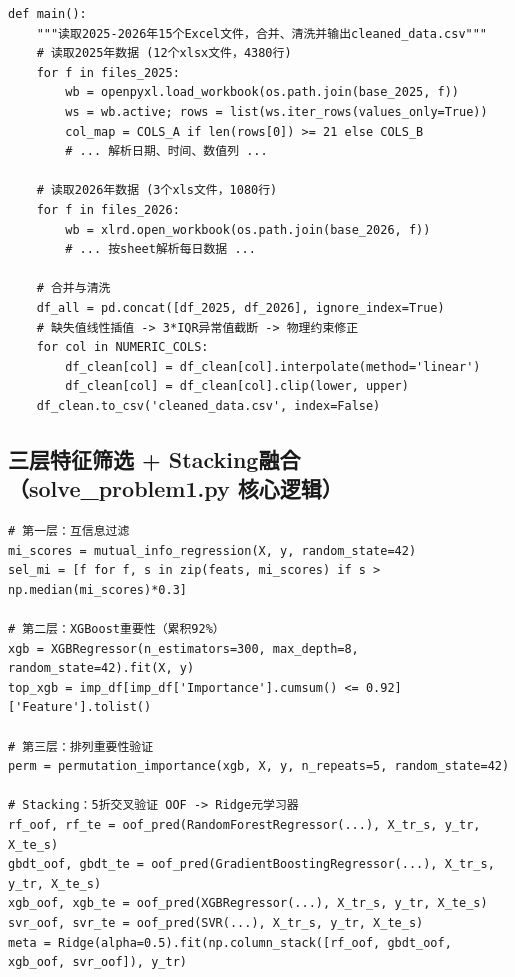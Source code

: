 \documentclass[12pt,a4paper]{ctexart}
\begin{document}
\begin{lstlisting}
def main():
    """读取2025-2026年15个Excel文件，合并、清洗并输出cleaned_data.csv"""
    # 读取2025年数据 (12个xlsx文件，4380行)
    for f in files_2025:
        wb = openpyxl.load_workbook(os.path.join(base_2025, f))
        ws = wb.active; rows = list(ws.iter_rows(values_only=True))
        col_map = COLS_A if len(rows[0]) >= 21 else COLS_B
        # ... 解析日期、时间、数值列 ...

    # 读取2026年数据 (3个xls文件，1080行)
    for f in files_2026:
        wb = xlrd.open_workbook(os.path.join(base_2026, f))
        # ... 按sheet解析每日数据 ...

    # 合并与清洗
    df_all = pd.concat([df_2025, df_2026], ignore_index=True)
    # 缺失值线性插值 -> 3*IQR异常值截断 -> 物理约束修正
    for col in NUMERIC_COLS:
        df_clean[col] = df_clean[col].interpolate(method='linear')
        df_clean[col] = df_clean[col].clip(lower, upper)
    df_clean.to_csv('cleaned_data.csv', index=False)
\end{lstlisting}

\subsection*{三层特征筛选 + Stacking融合（solve\_problem1.py 核心逻辑）}

\begin{lstlisting}
# 第一层：互信息过滤
mi_scores = mutual_info_regression(X, y, random_state=42)
sel_mi = [f for f, s in zip(feats, mi_scores) if s > np.median(mi_scores)*0.3]

# 第二层：XGBoost重要性（累积92%）
xgb = XGBRegressor(n_estimators=300, max_depth=8, random_state=42).fit(X, y)
top_xgb = imp_df[imp_df['Importance'].cumsum() <= 0.92]['Feature'].tolist()

# 第三层：排列重要性验证
perm = permutation_importance(xgb, X, y, n_repeats=5, random_state=42)

# Stacking：5折交叉验证 OOF -> Ridge元学习器
rf_oof, rf_te = oof_pred(RandomForestRegressor(...), X_tr_s, y_tr, X_te_s)
gbdt_oof, gbdt_te = oof_pred(GradientBoostingRegressor(...), X_tr_s, y_tr, X_te_s)
xgb_oof, xgb_te = oof_pred(XGBRegressor(...), X_tr_s, y_tr, X_te_s)
svr_oof, svr_te = oof_pred(SVR(...), X_tr_s, y_tr, X_te_s)
meta = Ridge(alpha=0.5).fit(np.column_stack([rf_oof, gbdt_oof, xgb_oof, svr_oof]), y_tr)
\end{lstlisting}
\end{document}
